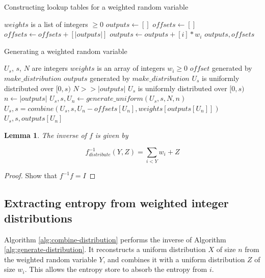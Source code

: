\documentclass[12pt]{article}
\newtheorem{lemma}{Lemma}
\begin{document}
\begin{algorithm}
\caption{Constructing lookup tables for a weighted random variable}
\label{alg:generate-lookup-tables}
\begin{algorithmic}[1]
\Require $weights$ is a list of integers $\ge0$
  \State $outputs \gets []$
  \State $offsets \gets []$
    \State $offsets \gets offsets + [|outputs|]$
    \State $outputs \gets outputs + [i] * w_i$
  \EndFor
  \State \Return $outputs, offsets$
\EndProcedure
\end{algorithmic}
\end{algorithm}


\begin{algorithm}
\caption{Generating a weighted random variable}
\label{alg:generate-distribution}
\begin{algorithmic}[1]
\Require $U_s$, $s$, $N$ are integers
\Require $weights$ is an array of integers $w_i \ge 0$
\Require $offset$ generated by $make\_distribution$ 
\Require $outputs$ generated by $make\_distribution$
\Require $U_s$ is uniformly distributed over $[0,s)$
\Require $N >> |outputs|$
\Ensure $U_s$ is uniformly distributed over $[0,s)$
    \State $n \gets |outputs|$
    \State $U_s, s, U_n \gets generate\_uniform(U_s, s, N, n)$
    \State $U_s, s = combine(U_s, s, U_n - offsets[U_n], weights[outputs[U_n]])$
    \State \Return $U_s, s, outputs[U_n]$
\EndProcedure
\end{algorithmic}
\end{algorithm}


\begin{lemma}
The inverse of $f$ is given by

    \begin{equation}
    f^{-1}_{distribute}(Y,Z) = \sum_{i<Y}w_i + Z
    \end{equation}
\end{lemma}

\begin{proof}
    Show that $f^{-1}f= I$

\end{proof}

\subsection {Extracting entropy from weighted integer distributions}

Algorithm \ref{alg:combine-distribution} performs the inverse of Algorithm \ref{alg:generate-distribution}. It reconstructs a uniform distribution $X$ of size $n$ from the weighted random variable $Y$, and combines it with a uniform distribution $Z$ of size $w_i$. This allows the entropy store to absorb the entropy from $i$.
\end{document}
